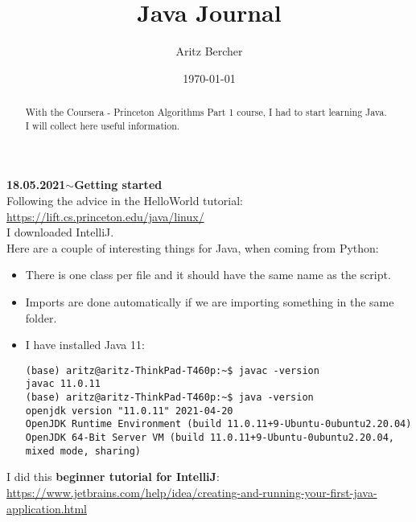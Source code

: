 \documentclass[11pt,a4paper]{article}
\title{Java Journal}
\author{Aritz Bercher}
\date{\today}
\newenvironment{loggentry}[2]%
{\noindent\textbf{#1}\hspace{1cm}$\mathbf{\sim}$\text{ }\textbf{#2}\\}{\vspace{0.5cm}}
\begin{document}
\maketitle

\begin{abstract}
With the Coursera - Princeton Algorithms Part 1 course, I had to start learning Java. I will collect here useful information.
\end{abstract}

\begin{loggentry}{18.05.2021}{Getting started}

Following the advice in the HelloWorld tutorial:\\
\url{https://lift.cs.princeton.edu/java/linux/}\\
I downloaded IntelliJ.\\

Here are a couple of interesting things for Java, when coming from Python:\\
\begin{itemize}
\item There is one class per file and it should have the same name as the script.
\item Imports are done automatically if we are importing something in the same folder.
\item I have installed Java 11:\\
\begin{verbatim}
(base) aritz@aritz-ThinkPad-T460p:~$ javac -version
javac 11.0.11
(base) aritz@aritz-ThinkPad-T460p:~$ java -version
openjdk version "11.0.11" 2021-04-20
OpenJDK Runtime Environment (build 11.0.11+9-Ubuntu-0ubuntu2.20.04)
OpenJDK 64-Bit Server VM (build 11.0.11+9-Ubuntu-0ubuntu2.20.04, mixed mode, sharing)
\end{verbatim}
\end{itemize}

I did this \textbf{beginner tutorial for IntelliJ}:\\
\url{https://www.jetbrains.com/help/idea/creating-and-running-your-first-java-application.html}

\end{loggentry}
\end{document}
